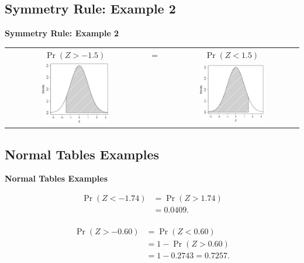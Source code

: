 \documentclass[compress]{beamer}        %
\makeatletter
\newcommand{\tcb}{\textcolor{beamer@blendedblue}}
\makeatother
\begin{document}
\subsection{Symmetry Rule: Example 2}
\begin{frame}{\bf \tcb{Symmetry Rule: Example 2}}
\begin{adjustwidth}{-0.2cm}{}
\begin{tabular}{c@{}c@{}c}
$\Pr(Z > -1.5)$ &$=$& $\Pr(Z < 1.5)$ \\
\includegraphics[width=0.5\textwidth, trim = 0.0cm 0.5cm 0.3cm 0.5cm, clip]{Symmetry2b}
&&
\includegraphics[width=0.5\textwidth, trim = 0.0cm 0.5cm 0.3cm 0.5cm, clip]{Symmetry2a}
\end{tabular}
\end{adjustwidth}


\end{frame}




\subsection{Normal Tables Examples}
\begin{frame}{\bf \tcb{Normal Tables Examples}}

\begin{align*}
\Pr(Z < -1.74) &= \Pr(Z > 1.74) \tag{symmetry rule} \\[0.2cm]
&= 0.0409. \tag{using tables} \\
\end{align*}

\begin{align*}
\Pr(Z > -0.60) &= \Pr(Z < 0.60) \tag{symmetry rule} \\[0.2cm]
&= 1 - \Pr(Z > 0.60) \tag{complement rule} \\[0.2cm]
&= 1 - 0.2743 = 0.7257. \tag{using tables} \\
\end{align*}


\end{frame}
\end{document}
